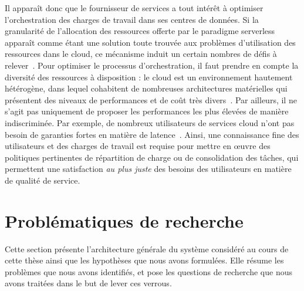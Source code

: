 Il apparaît donc que le fournisseur de services a tout intérêt à optimiser l'orchestration des charges de travail dans ses centres de données. Si la granularité de l'allocation des ressources offerte par le paradigme serverless apparaît comme étant une solution toute trouvée aux problèmes d'utilisation des ressources dans le cloud, ce mécanisme induit un certain nombres de défis à relever~\cite{Lannurien2023}. Pour optimiser le processus d'orchestration, il faut prendre en compte la diversité des ressources à disposition : le cloud est un environnement hautement hétérogène, dans lequel cohabitent de nombreuses architectures matérielles qui présentent des niveaux de performances et de coût très divers~\cite{reissHeterogeneityDynamicityClouds}. Par ailleurs, il ne s'agit pas uniquement de proposer les performances les plus élevées de manière indiscriminée. Par exemple, de nombreux utilisateurs de services cloud n'ont pas besoin de garanties fortes en matière de latence~\cite{tirmaziBorgNextGeneration2020}. Ainsi, une connaissance fine des utilisateurs et des charges de travail est requise pour mettre en œuvre des politiques pertinentes de répartition de charge ou de consolidation des tâches, qui permettent une satisfaction \textit{au plus juste} des besoins des utilisateurs en matière de qualité de service.

\section{Problématiques de recherche}

Cette section présente l'architecture générale du système considéré au cours de cette thèse ainsi que les hypothèses que nous avons formulées. Elle résume les problèmes que nous avons identifiés, et pose les questions de recherche que nous avons traitées dans le but de lever ces verrous.

